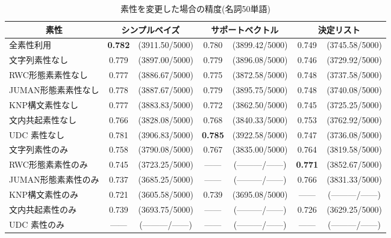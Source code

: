 \begin{table*}[t]
\caption{素性を変更した場合の精度(名詞50単語)}
\label{tab:sosei_change_noun}
  \begin{center}
\small\renewcommand{\arraystretch}{}
\begin{tabular}[c]{|l@{ }|c@{ }c@{ }|c@{ }c@{ }|c@{ }c@{ }|}\hline
\multicolumn{1}{|c|}{素性}  & \multicolumn{2}{|c|}{シンプルベイズ} & \multicolumn{2}{|c|}{サポートベクトル} & \multicolumn{2}{|c|}{決定リスト}  \\\hline
全素性利用          & {\bf 0.782}  & (3911.50/5000)  & 0.780  & (3899.42/5000)  & 0.749  & (3745.58/5000) \\\hline
文字列素性なし      & 0.779  & (3897.00/5000)  & 0.779  & (3896.08/5000)  & 0.746  & (3729.92/5000) \\
RWC形態素素性なし   & 0.777  & (3886.67/5000)  & 0.775  & (3872.58/5000)  & 0.748  & (3737.58/5000) \\
JUMAN形態素素性なし & 0.778  & (3887.67/5000)  & 0.779  & (3895.75/5000)  & 0.748  & (3740.08/5000) \\
KNP構文素性なし     & 0.777  & (3883.83/5000)  & 0.772  & (3862.50/5000)  & 0.745  & (3725.25/5000) \\
文内共起素性なし    & 0.766  & (3828.08/5000)  & 0.768  & (3840.33/5000)  & 0.753  & (3762.92/5000) \\
UDC 素性なし        & 0.781  & (3906.83/5000)  & {\bf 0.785}  & (3922.58/5000)  & 0.747  & (3736.08/5000) \\\hline
文字列素性のみ      & 0.758  & (3790.08/5000)  & 0.767  & (3835.00/5000)  & 0.764  & (3819.58/5000) \\
RWC形態素素性のみ   & 0.745  & (3723.25/5000)  & ------ & (---------/------) & {\bf 0.771}  & (3852.67/5000)  \\
JUMAN形態素素性のみ & 0.737  & (3685.25/5000)  & ------ & (---------/------) & 0.766  & (3831.33/5000) \\
KNP構文素性のみ     & 0.721  & (3605.58/5000)  & 0.739  & (3695.08/5000)  & ------ & (---------/------) \\
文内共起素性のみ    & 0.739  & (3693.75/5000)  & ------ & (---------/------) & 0.726  & (3629.25/5000) \\
UDC 素性のみ        & ------ & (---------/------) & ------ & (---------/------) & ------ & (---------/------) \\\hline
\end{tabular}
\end{center}
\end{table*}

